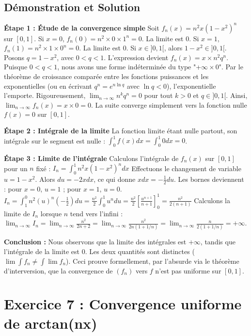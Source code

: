 \documentclass{report}
\begin{document}
\section*{Démonstration et Solution}

\textbf{Étape 1 : Étude de la convergence simple}
Soit $f_n(x) = n^2 x (1-x^2)^n$ sur $[0,1]$.
Si $x = 0$, $f_n(0) = n^2 \times 0 \times 1^n = 0$. La limite est 0.
Si $x = 1$, $f_n(1) = n^2 \times 1 \times 0^n = 0$. La limite est 0.
Si $x \in ]0, 1[$, alors $1-x^2 \in ]0, 1[$. Posons $q = 1-x^2$, avec $0 < q < 1$.
L'expression devient $f_n(x) = x \times n^2 q^n$.
Puisque $0 < q < 1$, nous avons une forme indéterminée du type "+$\infty \times 0$". Par le théorème de croissance comparée entre les fonctions puissances et les exponentielles (ou en écrivant $q^n = e^{n \ln q}$ avec $\ln q < 0$), l'exponentielle l'emporte. Rigoureusement, $\lim_{n \to \infty} n^k q^n = 0$ pour tout $k > 0$ et $q \in ]0,1[$.
Ainsi, $\lim_{n \to \infty} f_n(x) = x \times 0 = 0$.
La suite converge simplement vers la fonction nulle $f(x)=0$ sur $[0,1]$.

\textbf{Étape 2 : Intégrale de la limite}
La fonction limite étant nulle partout, son intégrale sur le segment est nulle :
$\int_0^1 f(x) dx = \int_0^1 0 dx = 0$.

\textbf{Étape 3 : Limite de l'intégrale}
Calculons l'intégrale de $f_n(x)$ sur $[0,1]$ pour un $n$ fixé :
$I_n = \int_0^1 n^2 x (1-x^2)^n dx$
Effectuons le changement de variable $u = 1-x^2$.
Alors $du = -2x dx$, ce qui donne $x dx = -\frac{1}{2} du$.
Les bornes deviennent : pour $x=0$, $u=1$ ; pour $x=1$, $u=0$.
$I_n = \int_1^0 n^2 (u)^n \left(-\frac{1}{2}\right) du = \frac{n^2}{2} \int_0^1 u^n du = \frac{n^2}{2} \left[ \frac{u^{n+1}}{n+1} \right]_0^1 = \frac{n^2}{2(n+1)}$
Calculons la limite de $I_n$ lorsque $n$ tend vers l'infini :
$\lim_{n \to \infty} I_n = \lim_{n \to \infty} \frac{n^2}{2n+2} = \lim_{n \to \infty} \frac{n^2}{2n(1 + 1/n)} = \lim_{n \to \infty} \frac{n}{2(1+1/n)} = +\infty$.

\textbf{Conclusion :}
Nous observons que la limite des intégrales est $+\infty$, tandis que l'intégrale de la limite est $0$. Les deux quantités sont distinctes ($\lim \int f_n \neq \int \lim f_n$). Ceci prouve formellement, par l'absurde via le théorème d'interversion, que la convergence de $(f_n)$ vers $f$ n'est pas uniforme sur $[0,1]$.

\newpage


\chapter*{Exercice 7 : Convergence uniforme de arctan(nx)}
\end{document}

